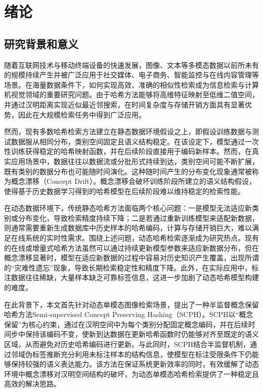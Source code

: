\chapter{绪论}
\section{研究背景和意义}
随着互联网技术与移动终端设备的快速发展，图像、文本等多模态数据以前所未有的规模持续产生并被广泛应用于社交媒体、电子商务、智能监控与在线内容管理等场景。在海量数据条件下，如何实现高效、准确的相似性检索成为信息检索与计算机视觉领域的重要研究问题。由于哈希方法能够将高维特征映射至低维二值空间，并通过汉明距离实现近似最近邻搜索，在时间复杂度与存储开销方面具有显著优势，因此在大规模检索任务中得到广泛应用。

然而，现有多数哈希检索方法建立在静态数据环境假设之上，即假设训练数据与测试数据服从相同分布，类别空间固定且语义结构稳定。在该设定下，模型通过一次性训练获得稳定的哈希映射函数，并在后续阶段直接用于编码新样本。然而，在真实应用场景中，数据往往以数据流或分批形式持续到达，类别空间可能不断扩展，既有类别的数据分布也可能随时间演化。这种随时间产生的分布变化现象通常被称为概念漂移（Concept Drift）。概念漂移会破坏训练阶段所建立的语义结构假设，使得基于历史数据学习得到的哈希模型在后续阶段难以维持稳定的检索性能。

在动态数据环境下，传统静态哈希方法面临两个核心问题：一是模型无法适应新类别或分布变化，导致检索精度持续下降；二是若通过重新训练模型来适配新数据，则通常需要重新生成数据库中历史样本的哈希编码，计算与存储开销巨大，难以满足在线系统的实时性需求。围绕上述问题，动态哈希检索逐渐成为研究热点。现有的在线或增量式哈希方法虽然可以通过持续更新模型参数来适应新数据分布，但在概念漂移显著时，模型在适应新数据的过程中容易对历史知识产生覆盖，出现所谓的“灾难性遗忘”现象，导致长期检索稳定性和精度下降。此外，在实际应用中，标注数据往往稀缺，大量样本缺乏可靠标签信息，这进一步加剧了动态哈希模型构建的难度。

在此背景下，本文首先针对动态单模态图像检索场景，提出了一种半监督概念保留哈希方法Semi-supervised Concept Preserving Hashing（SCPH）。SCPH以“概念保留”为核心约束，通过在汉明空间中为每个类别分配固定概念编码，并在后续时间步中保持该编码不变，使新到达数据在更新哈希函数时仍能够对齐至既定的语义区域，从而避免对历史哈希编码进行更新。与此同时，SCPH结合半监督机制，通过邻域伪标签推断充分利用未标注样本的结构信息，使模型在标注受限条件下仍能够保持较强的语义表达能力。该方法在保证系统更新效率的同时，有效缓解了动态环境中概念漂移对汉明空间结构的破坏，为动态单模态哈希检索提供了一种稳定且高效的解决思路。

